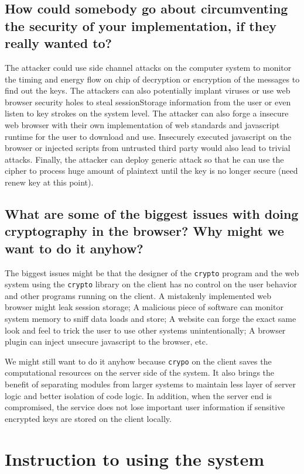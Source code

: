 \subsection{How could somebody go about circumventing the security of your implementation, if they really wanted to?}
The attacker could use side channel attacks on the computer system to monitor the timing and energy flow on chip of decryption or encryption of the messages to find out the keys. The attackers can also potentially implant viruses or use web browser security holes to steal sessionStorage information from the user or even listen to key strokes on the system level. The attacker can also forge a insecure web browser with their own implementation of web standards and javascript runtime for the user to download and use. Insecurely executed javascript on the browser or injected scripts from untrusted third party would also lead to trivial attacks. Finally, the attacker can deploy generic attack so that he can use the cipher to process huge amount of plaintext until the key is no longer secure (need renew key at this point).

\subsection{What are some of the biggest issues with doing cryptography in the browser? Why might we want to do it anyhow?} 

The biggest issues might be that the designer of the \texttt{crypto} program and the web system using the \texttt{crypto} library on the client has no control on the user behavior and other programs running on the client. A mistakenly implemented web browser might leak session storage; A malicious piece of software can monitor system memory to sniff data loads and store; A website can forge the exact same look and feel to trick the user to use other systems unintentionally; A browser plugin can inject unsecure javascript to the browser, etc.

We might still want to do it anyhow because \texttt{crypo} on the client saves the computational resources on the server side of the system. It also brings the benefit of separating modules from larger systems to maintain less layer of server logic and better isolation of code logic. In addition, when the server end is compromised, the service does not lose important user information if sensitive encrypted keys are stored on the client locally.

\section{Instruction to using the system}


